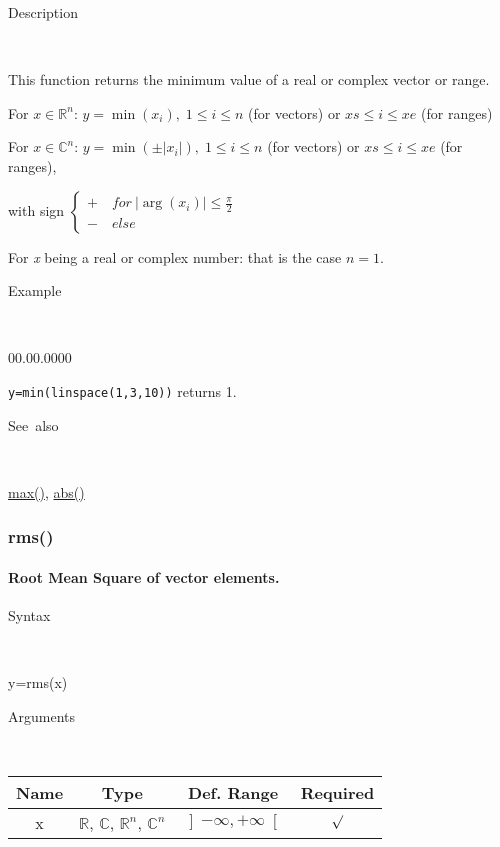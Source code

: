 \begin{description}
\item [Description]~
\end{description}
This function returns the minimum value of a real or complex vector
or range.

\medskip{}
For $x\in$$\mathbb{R}^{n}$: $y=$$\min\left(x_{i}\right),\;1\leq i\leq n$
(for vectors) or $xs\leq i\leq xe$ (for ranges)
\medskip{}

For $x\in\mathbb{C}^{n}$: $y=\min\left(\pm\left|x_{i}\right|\right),\;1\leq i\leq n$
(for vectors) or $xs\leq i\leq xe$ (for ranges),

with sign $\left\{ \begin{array}{l}
+\quad for\:\left|\arg\left(x_{i}\right)\right|\leq\frac{\pi}{2}\\
-\quad else\end{array}\right.$
\medskip{}

For \textit{x} being a real or complex number: that is the
case $n=1$.

\begin{description}
\item [Example]~
\end{description}
\begin{lyxlist}{00.00.0000}
\item [\texttt{y=min(linspace(1,3,10))}]returns 1.
\end{lyxlist}
\begin{description}
\item [See~also]~
\end{description}
\textcolor{blue}{\hyperlink{max}{max()}}\textcolor{black}{,} \textcolor{blue}{\hyperlink{abs}{abs()}}


\newpage
\subsubsection*{\hypertarget{rms}{}{\Large rms()}}


\paragraph{\label{par:rms}Root Mean Square of vector elements.}

\begin{description}
\item [Syntax]~
\end{description}
y=rms(x)

\begin{description}
\item [Arguments]~
\end{description}
\begin{tabular}{|c|c|c|c|}
\hline 
Name&
Type&
Def. Range&
Required\tabularnewline
\hline
\hline 
x&
$\mathbb{R}$, $\mathbb{C}$, $\mathbb{R}^{n}$, $\mathbb{C}^{n}$&
$\left]-\infty,+\infty\right[$&
$\surd$\tabularnewline
\hline
\end{tabular}

